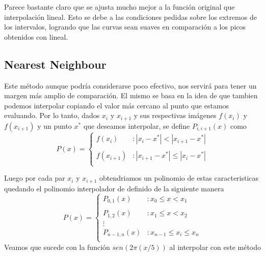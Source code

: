 Parece bastante claro que se ajusta mucho mejor a la función original que interpolación lineal. Esto se debe a las condiciones pedidas sobre los extremos de los intervalos, logrando que las curvas sean suaves en comparación a los picos obtenidos con lineal. 

\pagebreak

\subsection{Nearest Neighbour}

Este método aunque podría considerarse poco efectivo, nos servirá para tener un margen más amplio de comparación. El mismo se basa en la idea de que tambien podemos interpolar copiando el valor más cercano al punto que estamos evaluando. 
Por lo tanto, dados $x_i$ y $x_{i+1}$ y sus respectivas imágenes $f(x_i)$ y $f(x_{i+1})$ y un punto $x^*$ que deseamos interpolar, se define $P_{i, i+1}(x)$ como 
\vspace{4mm}
\begin{displaymath}
   P(x) = \left\{
     \begin{array}{lr}
       f(x_i)  & : |x_i - x^*| < |x_{i+1} - x^*|\\\\
       f(x_{i+1})  & : |x_{i+1} - x^*| \leq |x_i - x^*|\\
     \end{array}
   \right.
\end{displaymath} 

Luego por cada par $x_i$ y $x_{i+1}$ obtendriamos un polinomio de estas caracteristicas quedando el polinomio interpolador de definido de la siguiente manera
\vspace{4mm}
\begin{displaymath}
   P(x) = \left\{
     \begin{array}{lr}
       P_{0,1}(x)  & : x_0 \leq x < x_1\\\\
       P_{1,2}(x)  & : x_1 \leq x < x_2\\
       \vdots\\
       P_{n-1,n}(x) & : x_{n-1} \leq x_i \leq x_n\\
     \end{array}
   \right.
\end{displaymath} 
\vspace{4mm}
Veamos que sucede con la función $sen(2\pi(x/5))$ al interpolar con este método

